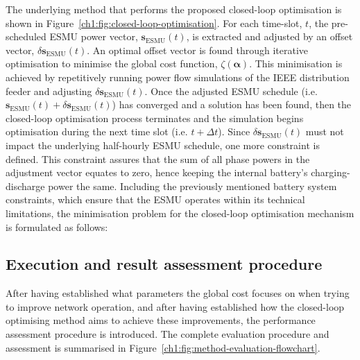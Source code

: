 


The underlying method that performs the proposed closed-loop optimisation is shown in Figure~\ref{ch1:fig:closed-loop-optimisation}.
For each time-slot, $t$, the pre-scheduled ESMU power vector, $\textbf{s}_\text{ESMU}(t)$, is extracted and adjusted by an offset vector, $\delta \textbf{s}_\text{ESMU}(t)$.
An optimal offset vector is found through iterative optimisation to minimise the global cost function, $\zeta(\boldsymbol{\alpha})$.
This minimisation is achieved by repetitively running power flow simulations of the IEEE distribution feeder and adjusting $\delta\textbf{s}_\text{ESMU}(t)$.
Once the adjusted ESMU schedule (i.e. $\textbf{s}_\text{ESMU}(t) + \delta \textbf{s}_\text{ESMU}(t)$) has converged and a solution has been found, then the closed-loop optimisation process terminates and the simulation begins optimisation during the next time slot (i.e. $t+\Delta t$).
Since $\delta \textbf{s}_\text{ESMU}(t)$ must not impact the underlying half-hourly ESMU schedule, one more constraint is defined.
This constraint assures that the sum of all phase powers in the adjustment vector equates to zero, hence keeping the internal battery's charging-discharge power the same.
Including the previously mentioned battery system constraints, which ensure that the ESMU operates within its technical limitations, the minimisation problem for the closed-loop optimisation mechanism is formulated as follows:



\subsection{Execution and result assessment procedure}
\label{ch1:subsec:method-execution}

After having established what parameters the global cost focuses on when trying to improve network operation, and after having established how the closed-loop optimising method aims to achieve these improvements, the performance assessment procedure is introduced.
The complete evaluation procedure and assessment is summarised in Figure~\ref{ch1:fig:method-evaluation-flowchart}.

